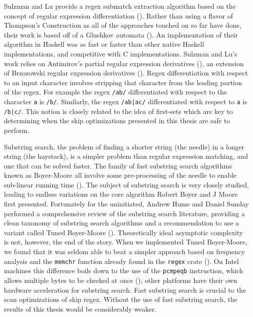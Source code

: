 Sulzman and Lu provide a regex submatch extraction algorithm
based on the concept of regular expression differentiation
(\cite{Sulzmann2012}). Rather than using a flavor of Thompson's
Construction as all of the approaches touched on so far have done,
their work is based off of a Glushkov automata (\cite{Allauzen2006}).
An implementation of their algorithm in Haskell was as fast or
faster than other native Haskell implementations, and competitive
with C implementations. Sulzman and Lu's work relies on
Antimirov's partial regular expression derivatives (\cite{Antimirov1996}),
an extension of Brzozowski regular expression derivatives
(\cite{Brzozowski1964}). Regex differentiation with respect
to an input character involves stripping that character from
the leading portion of the regex. For example the regex \verb'/ab/'
differentiated with respect to the character \verb'a' is \verb'/b/'.
Similarly, the regex \verb'/ab|ac/' differentiated with respect to
\verb'a' is \verb'/b|c/'. This notion is closely related to the
idea of first-sets which are key to determining when
the skip optimizations presented in this thesis are safe to perform.

Substring search, the problem of finding a shorter string (the needle) in
a longer string (the haystack), is a simpler problem than regular expression
matching, and one that can be solved faster. The family of fast substring
search algorithms known as Boyer-Moore all involve some pre-processing of
the needle to enable sub-linear running time (\cite{Boyer1977}).
The subject of substring search is very closely studied, leading to
endless variations on the core algorithm Robert Boyer and J Moore
first presented. Fortunately for the uninitiated, Andrew Hume and
Daniel Sunday performed a comprehensive review of the substring search
literature, providing a clean taxonomy of substring search algorithms
and a recommendation to use a variant called Tuned Boyer-Moore
(\cite{Hume1991}). Theoretically ideal asymptotic complexity is not,
however, the end of the story. When we implemented Tuned Boyer-Moore,
we found that it was seldom able to beat a simpler approach based on
frequency analysis and the \verb'memchr' function already found in
the \verb'regex' crate (\cite{GallantRegex}). On Intel machines this
difference boils down to the use of the \verb'pcmpeqb' instruction,
which allows multiple bytes to be checked at once
(\cite{IntelInstructionManual}); other platforms have their own hardware
acceleration for substring search. Fast substring search is crucial to
the scan optimizations of skip regex. Without the use of fast substring
search, the results of this thesis would be considerably weaker.

